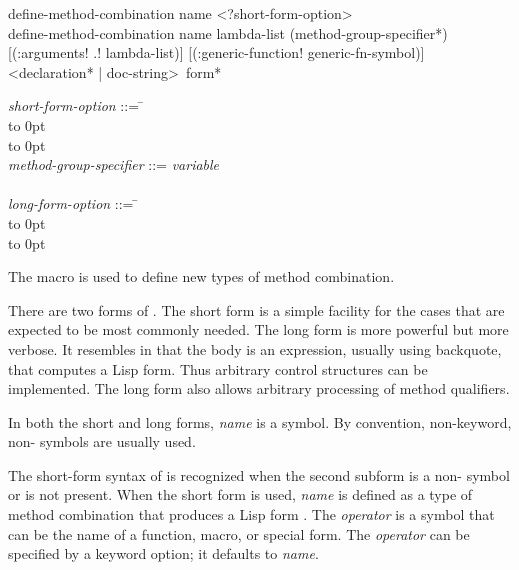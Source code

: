 \begin{defmac}
define-method-combination name <?short-form-option> \\
define-method-combination name lambda-list
    ({method-group-specifier}*)
    [(\!:arguments! \!.! lambda-list)]
    [(\!:generic-function! generic-fn-symbol)]
    <{declaration}* | doc-string>
    {\,form}*

\begin{tabbing}
\pushtabs\emph{short-form-option\/} ::= \= \\
\>\hbox to 0pt{\hss\Mor~} \\
\>\hbox to 0pt{\hss\Mor~} \poptabs \\
\pushtabs\emph{method-group-specifier\/} ::= \cd{(}\=\emph{variable\/}
     \\
\>\cd{)} \poptabs \\
\pushtabs\emph{long-form-option\/} ::= \= \\
\>\hbox to 0pt{\hss\Mor~} \\
\>\hbox to 0pt{\hss\Mor~} \poptabs
\end{tabbing}
The macro  is used to define new types
of method combination.

There are two forms of .  The short
form is a simple facility for the cases that are expected
to be most commonly needed.  The long form is more powerful but more
verbose.  It resembles  in that the body is an
expression, usually using backquote, that computes a Lisp form.  Thus
arbitrary control structures can be implemented.  The long form also
allows arbitrary processing of method qualifiers.





In both the short and long forms, \emph{name\/} is a symbol.  By convention,
non-keyword, non- symbols are usually used.

\medskip

The short-form syntax of  is recognized
when the second subform is a non- symbol or is not present.
When the short form is used, \emph{name\/} is defined as a type of
method combination that produces a Lisp form .  The \emph{operator\/} is a symbol
that can be the name of a function, macro, or special form.  The
\emph{operator\/} can be specified by a keyword option; it defaults to {\it
name}.


\end{defmac}
